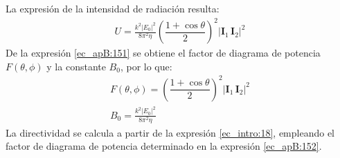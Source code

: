 La expresión de la intensidad de radiación resulta:
\begin{align}
U = \frac{k^2\left|E_0\right|^2}{8\pi^2\eta}\left(\dfrac{1 + \cos\theta}{2}\right)^2\!\lvert{\mathbf{I}_1}\,{\mathbf{I}_2}\rvert^2
\label{ec_apB:151}
\end{align}
De la expresión \eqref{ec_apB:151} se obtiene el factor de diagrama de potencia $F\left(\theta,\phi\right)$ y la constante $B_0$, por lo que:
\begin{gather}
F\left(\theta,\phi\right) = \left(\dfrac{1 + \cos\theta}{2}\right)^2\!\lvert{\mathbf{I}_1}\,{\mathbf{I}_2}\rvert^2
\label{ec_apB:152}\\
B_0 = \frac{k^2\left|E_0\right|^2}{8\pi^2\eta}
\label{ec_apB:153}
\end{gather}
La directividad se calcula a partir de la expresión \eqref{ec_intro:18}, empleando el factor de diagrama de potencia determinado en la expresión \eqref{ec_apB:152}.
